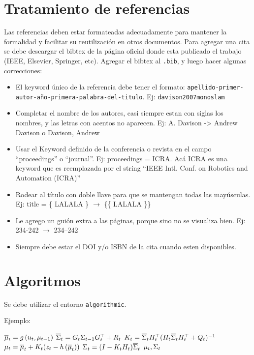 \documentclass[a4paper,	11pt]{article}
\begin{document}
\section{Tratamiento de referencias}
Las referencias deben estar formateadas adecuadamente para mantener la formalidad y facilitar su reutilización en otros documentos. Para agregar una cita se debe descargar el bibtex de la página oficial donde esta publicado el trabajo (IEEE, Elsevier, Springer, etc). Agregar el bibtex al \lstinline{.bib}, y luego hacer algunas correcciones:
\begin{itemize}
    \item El keyword único de la referencia debe tener el formato: \lstinline{apellido-primer-autor-año-primera-palabra-del-titulo}. Ej: \lstinline{davison2007monoslam}
    \item Completar el nombre de los autores, casi siempre estan con siglas los nombres, y las letras con acentos no aparecen. Ej: A. Davison -> Andrew Davison o Davison, Andrew
    \item Usar el Keyword definido de la conferencia o revista en el campo ``proceedings'' o ``journal''. Ej: proceedings = ICRA. Acá ICRA es una keyword que es reemplazada por el string ``IEEE Intl. Conf. on Robotics and Automation (ICRA)''
    \item Rodear al título con doble llave para que se mantengan todas las mayúsculas. Ej: title = \{ LALALA \} $\rightarrow$ \{\{ LALALA \}\}
    \item Le agrego un guión extra a las páginas, porque sino no se visualiza bien. Ej: 234-242 $\rightarrow$ 234--242
    \item Siempre debe estar el DOI y/o ISBN de la cita cuando esten disponibles.
\end{itemize}


\section{Algoritmos}

Se debe utilizar el entorno \lstinline{algorithmic}.

Ejemplo:
    \begin{algorithmic}[1]
        \State $\overline{\mu}_{t} = g\left( u_{t}, \mu_{t-1} \right)$
        \State $\overline{\Sigma}_{t} = G_{t} \Sigma_{t-1} G_{t}^{\top}+R_{t}$
        \Statex
        \State $K_{t} = \overline{\Sigma}_{t} H_{t}^{\top} (H_{t} \overline{\Sigma}_{t}  H_{t}^{\top} + Q_{t})^{-1} $
        \State $\mu_{t} = \overline{\mu}_{t} + K_{t} (z_{t} - h\left( \overline{\mu}_{t} \right))$
        \State $\Sigma_{t} =  (I - K_{t} H_{t}) \overline{\Sigma}_{t}$
        \State \Return $\mu_{t}, \Sigma_{t}$
    \EndProcedure
    \end{algorithmic}
\end{document}
